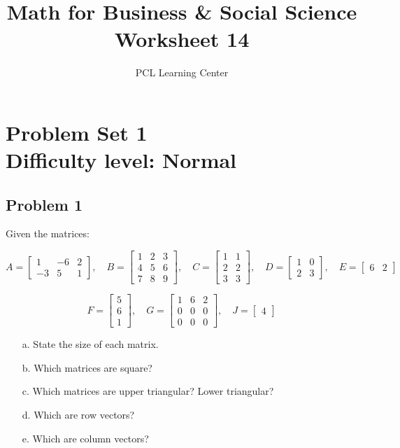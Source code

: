 \documentclass[12pt]{article}
\title{Math for Business \& Social Science\\ Worksheet 14}
\author{PCL Learning Center}
\date{}
\begin{document}
\maketitle

\section*{Problem Set 1\\Difficulty level: Normal}
\subsection*{Problem 1}
Given the matrices:

\[
A = \begin{bmatrix}
1 & -6 & 2 \\
-3 & 5 & 1
\end{bmatrix}, \quad
B = \begin{bmatrix}
1 & 2 & 3 \\
4 & 5 & 6 \\
7 & 8 & 9
\end{bmatrix}, \quad
C = \begin{bmatrix}
1 & 1 \\
2 & 2 \\
3 & 3
\end{bmatrix}, \quad
D = \begin{bmatrix}
1 & 0 \\
2 & 3
\end{bmatrix}, \quad
E = \begin{bmatrix}
6 & 2
\end{bmatrix}
\]

\[
F = \begin{bmatrix}
5 \\
6 \\
1
\end{bmatrix}, \quad
G = \begin{bmatrix}
1 & 6 & 2 \\
0 & 0 & 0 \\
0 & 0 & 0
\end{bmatrix}, \quad
J = \begin{bmatrix}
4
\end{bmatrix}
\]

\begin{enumerate}
    \item[a.] State the size of each matrix.
    \item[b.] Which matrices are square?
    \item[c.] Which matrices are upper triangular? Lower triangular?
    \item[d.] Which are row vectors?
    \item[e.] Which are column vectors?
\end{enumerate}
\end{document}
